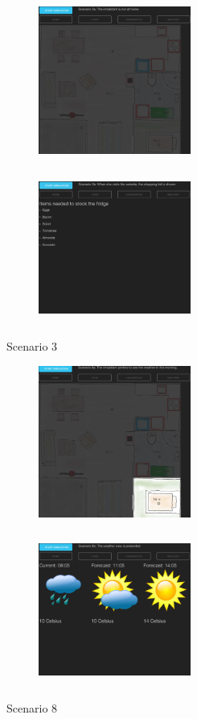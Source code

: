 \begin{figure}[ht]
\centering
\begin{subfigure}{0.32\textwidth}
\includegraphics[width=5cm, height=5cm]{fig/scenario3a}
\caption{}
\label{fig:3a}
\end{subfigure}
\begin{subfigure}{0.32\textwidth}
\includegraphics[width=5cm, height=5cm]{fig/scenario3b}
\caption{}
\label{fig:3b}
\end{subfigure}
\caption{Scenario 3}
\label{fig:scenario3}
\end{figure}
\begin{figure}[ht]
\centering
\begin{subfigure}{0.32\textwidth}
\includegraphics[width=5cm, height=5cm]{fig/scenario8a}
\caption{}
\label{fig:8a}
\end{subfigure}
\begin{subfigure}{0.32\textwidth}
\includegraphics[width=5cm, height=5cm]{fig/scenario8b}
\caption{}
\label{fig:8b}
\end{subfigure}
\caption{Scenario 8}
\label{fig:scenario8}
\end{figure}
